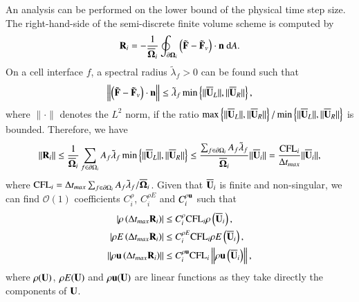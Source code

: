 An analysis can be performed on the lower bound of the physical time step size.
The right-hand-side of the semi-discrete finite volume scheme is computed by
\begin{equation}
    \label{eq:Semi-FV-1}
    \mathbf{R}_i = -\frac{1}{\overline{\mathbf{\Omega}}_i} \oint_{\partial \mathbf{\Omega}_i} \left(\tilde{\mathbf{F}} - \tilde{\mathbf{F}}_v \right) \cdot \mathbf{n} \ \dd A.
\end{equation}
On a cell interface $f$, a spectral radius $\tilde{\lambda}_f>0$ can be found such that
\begin{equation}
    \left\| \left(\tilde{\mathbf{F}} - \tilde{\mathbf{F}}_v \right) \cdot \mathbf{n} \right\| \leq \tilde{\lambda}_f \min \left\{\|\overline{\mathbf{U}}_L\|, \|\overline{\mathbf{U}}_R\| \right\},
\end{equation}
where $\|\cdot\|$ denotes the $L^2$ norm, if the ratio $\max \left\{\|\overline{\mathbf{U}}_L\|, \|\overline{\mathbf{U}}_R\| \right\}/\min \left\{\|\overline{\mathbf{U}}_L\|, \|\overline{\mathbf{U}}_R\| \right\}$ is bounded.
Therefore, we have
\begin{equation}
\label{eq:upper-bound-residual}
    \left\| \mathbf{R}_i \right\| 
    \leq \frac{1}{\overline{\mathbf{\Omega}}_i} \sum_{f \in \partial \Omega_i}{
        A_{f} \tilde{\lambda}_{f} \min \left\{\|\overline{\mathbf{U}}_L\|, \|\overline{\mathbf{U}}_R\| \right\}
    } 
    \leq \frac{\sum_{f \in \partial \Omega_i} A_f\tilde{\lambda}_f}{\overline{\mathbf{\Omega}}_i}\|\overline{\mathbf{U}}_i\|
    =
    \frac{\text{CFL}_i}{\mathrm\Delta t_{max}}\|\overline{\mathbf{U}}_i\|,
\end{equation}
where $\text{CFL}_i= \mathrm\Delta t_{max}\sum_{f \in \partial \Omega_i} A_f \tilde{\lambda}_f/\overline{\mathbf{\Omega}}_i$. 
Given that $\overline{\mathbf{U}}_i$ is finite and non-singular, we can find $\mathcal{O}(1)$ coefficients $C^{\rho}_i$, $C^{\rho E}_i$ and $C^{\rho \mathbf{u}}_i$ such that
\begin{equation}
    \begin{aligned}
    \label{eq:inc_upper_cond_const_coef}
        \left| \rho\left( \mathrm\Delta t_{max} \mathbf{R}_i \right) \right|
        & \leq
        C^\rho_i    \text{CFL}_i \rho\left( \overline{\mathbf{U}}_i \right),\\
        \left| \rho E\left( \mathrm\Delta t_{max} \mathbf{R}_i \right) \right|
        & \leq
        C^{\rho E}_i \text{CFL}_i \rho E\left( \overline{\mathbf{U}}_i \right),\\
        \left\| \rho \mathbf{u}\left( \mathrm\Delta t_{max} \mathbf{R}_i \right) \right\|
        & \leq 
        C^{\rho \mathbf{u}}_i \text{CFL}_i  \left\| \rho \mathbf{u}\left( \overline{\mathbf{U}}_i \right)              \right\|,\\
    \end{aligned}
\end{equation}
where $\rho(\mathbf{U})$, $\rho E(\mathbf{U})$ and $\rho \mathbf{u}(\mathbf{U})$ are linear functions as they take directly the components of $\mathbf{U}$.
